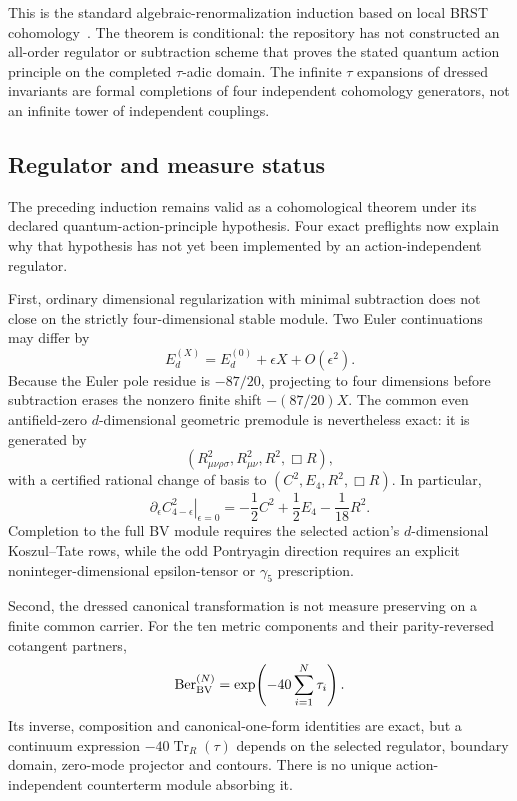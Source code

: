 \documentclass[11pt]{article}
\theoremstyle{definition}
\theoremstyle{remark}
\begin{document}
This is the standard algebraic-renormalization induction based on local BRST
cohomology~\cite{BarnichBrandtHenneauxI}.  The theorem is conditional: the
repository has not constructed an all-order regulator or subtraction scheme
that proves the stated quantum action principle on the completed
$\tau$-adic domain.  The infinite $\tau$ expansions of dressed invariants are
formal completions of four independent cohomology generators, not an
infinite tower of independent couplings.

\subsection{Regulator and measure status}

The preceding induction remains valid as a cohomological theorem under its
declared quantum-action-principle hypothesis.  Four exact preflights now
explain why that hypothesis has not yet been implemented by an
action-independent regulator.

First, ordinary dimensional regularization with minimal subtraction does not
close on the strictly four-dimensional stable module.  Two Euler
continuations may differ by
\[
 E_d^{(X)}=E_d^{(0)}+\epsilon X+O(\epsilon^2).
\]
Because the Euler pole residue is $-87/20$, projecting to four dimensions
before subtraction erases the nonzero finite shift $-(87/20)X$.  The common
even antifield-zero $d$-dimensional geometric premodule is nevertheless exact:
it is generated by
\[
 (R_{\mu\nu\rho\sigma}^2,R_{\mu\nu}^2,R^2,\Box R),
\]
with a certified rational change of basis to $(C^2,E_4,R^2,\Box R)$.  In
particular,
\[
 \left.\partial_\epsilon C_{4-\epsilon}^2\right|_{\epsilon=0}
 =-\frac12C^2+\frac12E_4-\frac1{18}R^2.
\]
Completion to the full BV module requires the selected action's
$d$-dimensional Koszul--Tate rows, while the odd Pontryagin direction requires
an explicit noninteger-dimensional epsilon-tensor or $\gamma_5$ prescription.

Second, the dressed canonical transformation is not measure preserving on a
finite common carrier.  For the ten metric components and their
parity-reversed cotangent partners,
\[
 \operatorname{Ber}_{\rm BV}^{(N)}
 =\exp\!\left(-40\sum_{i=1}^N\tau_i\right).
\]
Its inverse, composition and canonical-one-form identities are exact, but a
continuum expression $-40\operatorname{Tr}_R(\tau)$ depends on the selected
regulator, boundary domain, zero-mode projector and contours.  There is no
unique action-independent counterterm module absorbing it.
\end{document}
